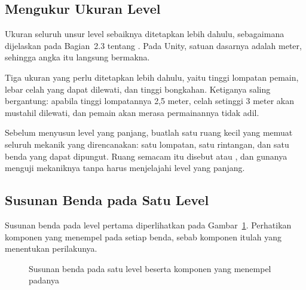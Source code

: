 \subsection{Mengukur Ukuran Level}

Ukuran seluruh unsur level sebaiknya ditetapkan lebih dahulu, sebagaimana
dijelaskan pada Bagian~2.3 tentang . Pada Unity, satuan
dasarnya adalah meter, sehingga angka itu langsung bermakna.

Tiga ukuran yang perlu ditetapkan lebih dahulu, yaitu tinggi lompatan pemain,
lebar celah yang dapat dilewati, dan tinggi bongkahan. Ketiganya saling
bergantung: apabila tinggi lompatannya 2,5 meter, celah setinggi 3 meter akan
mustahil dilewati, dan pemain akan merasa permainannya tidak adil.

\begin{tipsbox}
Sebelum menyusun level yang panjang, buatlah satu ruang kecil yang memuat
seluruh mekanik yang direncanakan: satu lompatan, satu rintangan, dan satu
benda yang dapat dipungut. Ruang semacam itu disebut  atau
, dan gunanya menguji mekaniknya tanpa harus menjelajahi
level yang panjang.
\end{tipsbox}

\subsection{Susunan Benda pada Satu Level}

Susunan benda pada level pertama diperlihatkan pada
Gambar~\ref{fig:hierarki-level}. Perhatikan komponen yang menempel pada setiap
benda, sebab komponen itulah yang menentukan perilakunya.

\begin{figure}[htbp]
\centering

\caption{Susunan benda pada satu level beserta komponen yang menempel padanya}
\label{fig:hierarki-level}
\end{figure}
